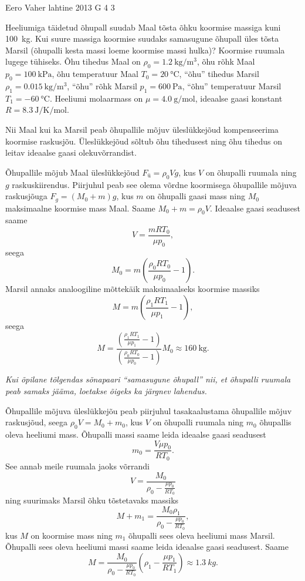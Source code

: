 {Eero Vaher} %
{lahtine} %
{2013} %
{G 4} %
{3} %
{
\ifStatement
Heeliumiga täidetud õhupall suudab Maal tõsta õhku koormise massiga kuni
\SI{100}{\kilogram}. Kui suure massiga koormise suudaks samasugune õhupall
üles tõsta Marsil (õhupalli kesta massi loeme koormise massi hulka)? 
Koormise ruumala lugege tühiseks. Õhu tihedus Maal on
$\rho_0=\SI{1.2}{\kilogram\per\meter^3}$, õhu rõhk Maal
$p_0=\SI{100}{\kilo\pascal}$, õhu temperatuur Maal $T_0=\SI{20}{\celsius}$,
\enquote{õhu} tihedus Marsil $\rho_1=\SI{0.015}{\kilogram\per\meter^3}$, \enquote{õhu} rõhk Marsil
$p_1=\SI{600}{\pascal}$, \enquote{õhu} temperatuur Marsil $T_1=\SI{-60}{\celsius}$.
Heeliumi molaarmass on $\mu=\SI{4.0}{\gram\per\mole}$, ideaalse gaasi konstant
$R=\SI{8.3}{\joule\per\kelvin\per\mole}$.
\fi


\ifHint
Nii Maal kui ka Marsil peab õhupallile mõjuv üleslükkejõud kompenseerima koormise raskusjõu. Üleslükkejõud sõltub õhu tihedusest ning õhu tihedus on leitav ideaalse gaasi olekuvõrrandist.
\fi


\ifSolution
Õhupallile mõjub Maal üleslükkejõud $F_{ü}=\rho_0Vg$, kus $V$ on õhupalli ruumala ning $g$ raskuskiirendus. Piirjuhul peab see olema võrdne koormisega õhupallile mõjuva raskusjõuga $F_g=(M_0+m)g$, kus $m$ on õhupalli gaasi mass ning $M_0$ maksimaalne koormise mass Maal. Saame $M_0+m=\rho_0V$. Ideaalse gaasi seadusest saame
\[
V=\frac{mRT_0}{\mu p_0},
\]
seega 
\[
M_0=m\left(\frac{\rho_0 RT_0}{\mu p_0}-1\right).
\]
Marsil annaks analoogiline mõttekäik maksimaalseks koormise massiks
\[
M=m(\frac{\rho_1RT_1}{\mu p_1}-1),
\]
seega
\[M=\frac{\left(\frac{\rho_1RT_1}{\mu p_1}-1\right)}{(\frac{\rho_0RT_0}{\mu p_0}-1)}M_0\approx \SI{160}{\kilogram}.
\]

{\em Kui õpilane tõlgendas sõnapaari ``samasugune õhupall'' nii, et õhupalli ruumala peab samaks jääma, loetakse õigeks ka järgnev lahendus.}

Õhupallile mõjuva üleslükkejõu peab piirjuhul tasakaalustama õhupallile mõjuv raskusjõud, seega $\rho_0 V=M_0+m_0$, kus $V$ on õhupalli ruumala ning $m_0$ õhupallis oleva heeliumi mass. Õhupalli massi saame leida ideaalse gaasi seadusest
\[
m_0=\frac{V\mu p_0}{RT_0}.
\]
See annab meile ruumala jaoks võrrandi
\[
V=\frac{M_0}{\rho_0-\frac{\mu p_0}{RT_0}}
\]
ning suurimaks Marsil õhku tõstetavaks massiks
\[
M+m_1=\frac{M_0\rho_1}{\rho_0-\frac{\mu p_0}{RT_0}},
\]
kus $M$ on koormise mass ning $m_1$ õhupalli sees oleva heeliumi mass Marsil. Õhupalli sees oleva heeliumi massi saame leida ideaalse gaasi seadusest. Saame
\[
M=\frac{M_0}{\rho_0-\frac{\mu p_0}{RT_0}}\left(\rho_1-\frac{\mu p_1}{RT_1}\right)\approx \SI{1,3}{kg}.
\]
\fi


}
